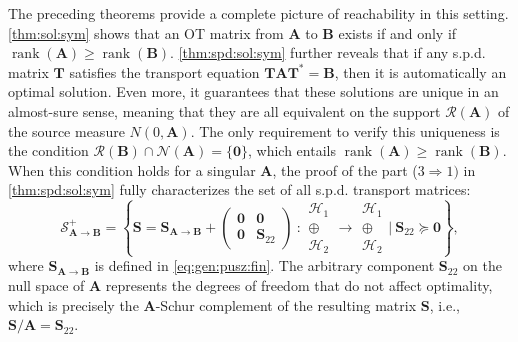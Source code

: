 \documentclass[noinfoline]{imsart}\setcounter{tocdepth}{2}
\newcommand{\m}[1]{\mathbf{#1}} %
\renewcommand{\c}[1]{\mathcal{#1}} %
\DeclareMathOperator*{\rk}{rank}
\theoremstyle{plain}
\begin{document}
The preceding theorems provide a complete picture of reachability in this setting. \cref{thm:sol:sym} shows that an OT matrix from $\m{A}$ to $\m{B}$ exists if and only if $\rk(\m{A}) \geq \rk(\m{B})$. \cref{thm:spd:sol:sym} further reveals that if any s.p.d. matrix $\m{T}$ satisfies the transport equation $\m{T}\m{A}\m{T}^*=\m{B}$, then it is automatically an optimal solution. Even more, it guarantees that these solutions are unique in an almost-sure sense, meaning that they are all equivalent on the support $\c{R}(\m{A})$ of the source measure $N(0, \m{A})$. The only requirement to verify this uniqueness is the condition $ \c{R}(\m{B}) \cap \c{N}(\m{A}) = \{ \m{0} \}$, which entails $\rk(\m{A}) \geq \rk(\m{B})$. When this condition holds for a singular $\m{A}$, the proof of the part ($3 \Rightarrow 1)$ in \cref{thm:spd:sol:sym} fully characterizes the set of all s.p.d. transport matrices:
\begin{equation*}
    \c{S}_{\m{A} \to \m{B}}^{+} = \left\{
    \m{S} = \m{S}_{\m{A} \to \m{B}} + 
    \begin{pmatrix}
    \m{0} & \m{0} \\
    \m{0} & \m{S}_{22}
    \end{pmatrix}
    \    :
    \begin{array}{c}
    \c{H}_{1} \\
    \oplus \\
    \c{H}_{2}
    \end{array}
    \rightarrow
    \begin{array}{c}
    \c{H}_{1} \\
    \oplus \\
    \c{H}_{2}
    \end{array} \vert \ \m{S}_{22} \succeq \m{0} \right\},
\end{equation*}
where $\m{S}_{\m{A} \to \m{B}}$ is defined in \eqref{eq:gen:pusz:fin}. The arbitrary component $\m{S}_{22}$ on the null space of $\m{A}$ represents the degrees of freedom that do not affect optimality, which is precisely the $\m{A}$-Schur complement of the resulting matrix $\m{S}$, i.e., $\m{S}/\m{A} = \m{S}_{22}$.
\end{document}
